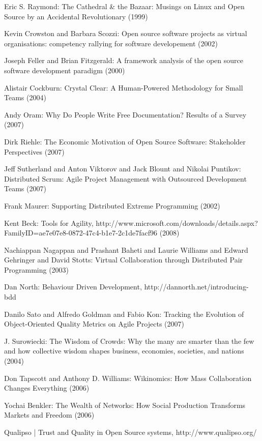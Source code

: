 \documentclass[lnbip]{svmultln}
\begin{document}
\begin{thebibliography}{5}
 Eric S. Raymond: The Cathedral \& the Bazaar:
  Musings on {Linux} and Open Source by an Accidental Revolutionary
  (1999)

 Kevin Crowston and Barbara Scozzi: Open source
  software projects as virtual organisations: competency rallying for
  software developement (2002)

 Joseph Feller and Brian Fitzgerald: A
  framework analysis of the open source software development paradigm
  (2000)

 Alistair Cockburn: Crystal Clear: A
  Human-Powered Methodology for Small Teams (2004)

 Andy Oram: Why Do People Write Free Documentation?
  Results of a Survey (2007)

 Dirk Riehle: The Economic Motivation of Open
  Source Software: Stakeholder Perspectives (2007)

 Jeff Sutherland and Anton Viktorov and Jack
  Blount and Nikolai Puntikov: Distributed Scrum: Agile Project
  Management with Outsourced Development Teams (2007)

 Frank Maurer: Supporting Distributed Extreme
  Programming (2002)

 Kent Beck: Tools for Agility,
  http://www.microsoft.com/downloads/details.aspx?FamilyID=ae7e07e8-0872-47c4-b1e7-2c1de7facf96
  (2008)

 Nachiappan Nagappan and Prashant Baheti and
  Laurie Williams and Edward Gehringer and David Stotts: Virtual
  Collaboration through Distributed Pair Programming (2003)

 Dan North: Behaviour Driven Development,
  http://dannorth.net/introducing-bdd

 Danilo Sato and Alfredo Goldman and Fabio Kon:
  Tracking the Evolution of Object-Oriented Quality Metrics on Agile
  Projects (2007)

 J. Surowiecki: The Wisdom of Crowds: Why the
  many are smarter than the few and how collective wisdom shapes
  business, economies, societies, and nations (2004)

 Don Tapscott and Anthony D. Williams:
  Wikinomics: How Mass Collaboration Changes Everything (2006)

 Yochai Benkler: The Wealth of Networks: How
  Social Production Transforms Markets and Freedom (2006)

 Qualipso | Trust and Quality in Open Source
  systems, http://www.qualipso.org/

\end{thebibliography}
\end{document}
